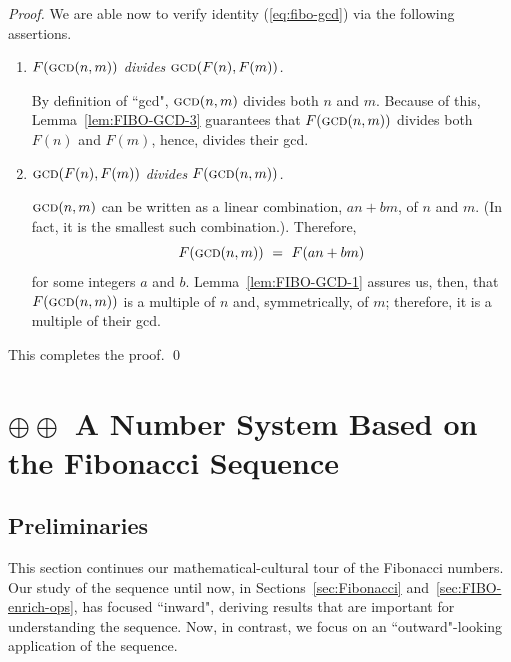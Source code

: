 \begin{proof}
\medskip

\noindent
We are able now to verify identity (\ref{eq:fibo-gcd}) via the following assertions.

\medskip

\begin{enumerate}
\item
{\em $F(\mbox{\sc gcd}(n,m))$ divides $\mbox{\sc gcd}(F(n), F(m))$.}

\smallskip

By definition of ``{\sc gcd}", $\mbox{\sc gcd}(n,m)$ divides both $n$ and $m$.  Because of this,
Lemma~\ref{lem:FIBO-GCD-3} guarantees that $F(\mbox{\sc gcd}(n,m))$ divides both $F(n)$ and $F(m)$, hence, divides their {\sc gcd}.

\medskip

\item
{\em $\mbox{\sc gcd}(F(n), F(m))$ divides $F(\mbox{\sc gcd}(n,m))$.}

\smallskip

$\mbox{\sc gcd}(n,m)$ can be written as a linear combination, $a n + b m$, of $n$ and $m$.  (In fact, it is the smallest such combination.). Therefore, 
\[ F(\mbox{\sc gcd}(n,m)) \ = \ F(a n + b m) \]
for some integers $a$ and $b$.  Lemma~\ref{lem:FIBO-GCD-1} assures us, then, that
$F(\mbox{\sc gcd}(n,m))$ is a multiple of $n$ and, symmetrically, of $m$; therefore, it is a multiple of their {\sc gcd}. 
\end{enumerate}
This completes the proof.   \qed
\end{proof}


\section{$\oplus \oplus$ A Number System Based on the Fibonacci Sequence}
\label{sec:numerals-special-families}
\label{sec:Fibo-numbers}

\subsection{Preliminaries}
\label{sec:FIBO-num-intro}

This section continues our mathematical-cultural tour of the Fibonacci numbers.  Our study of the sequence until now, in Sections~\ref{sec:Fibonacci} and~\ref{sec:FIBO-enrich-ops}, has focused ``inward", deriving results that are important for understanding the sequence.  Now, in contrast, we focus on an ``outward"-looking application of the sequence.

